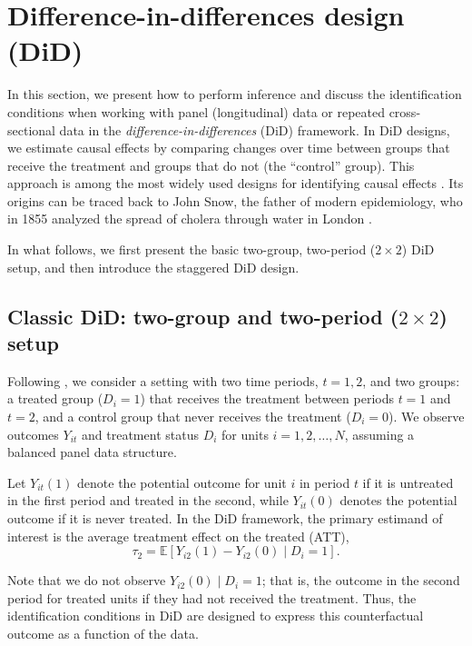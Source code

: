 \section{Difference-in-differences design (DiD)}\label{sec12_5}

In this section, we present how to perform inference and discuss the identification conditions when working with panel (longitudinal) data or repeated cross-sectional data in the \textit{difference-in-differences} (DiD) framework. In DiD designs, we estimate causal effects by comparing changes over time between groups that receive the treatment and groups that do not (the ``control'' group). This approach is among the most widely used designs for identifying causal effects \cite{baker2025did_guide}. Its origins can be traced back to John Snow, the father of modern epidemiology, who in 1855 analyzed the spread of cholera through water in London \cite{chernozhukov2024applied}.

In what follows, we first present the basic two-group, two-period ($2\times2$) DiD setup, and then introduce the staggered DiD design.

\subsection{Classic DiD: two-group and two-period ($2\times2$) setup}\label{sec12_51}

Following \cite{roth2023whats}, we consider a setting with two time periods, \( t = 1, 2 \), and two groups: a treated group (\( D_i = 1 \)) that receives the treatment between periods \( t = 1 \) and \( t = 2 \), and a control group that never receives the treatment (\( D_i = 0 \)). We observe outcomes \( Y_{it} \) and treatment status \( D_i \) for units \( i = 1, 2, \dots, N \), assuming a balanced panel data structure.

Let \( Y_{it}(1) \) denote the potential outcome for unit \( i \) in period \( t \) if it is untreated in the first period and treated in the second, while \( Y_{it}(0) \) denotes the potential outcome if it is never treated. In the DiD framework, the primary estimand of interest is the average treatment effect on the treated (ATT),
\[
\tau_{2} = \mathbb{E}[Y_{i2}(1) - Y_{i2}(0) \mid D_i = 1].
\]

Note that we do not observe \( Y_{i2}(0) \mid D_i = 1 \); that is, the outcome in the second period for treated units if they had not received the treatment. Thus, the identification conditions in DiD are designed to express this counterfactual outcome as a function of the data.


